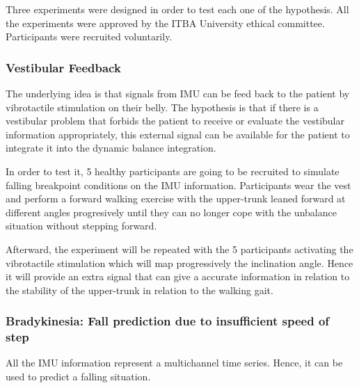 \documentclass[conference]{IEEEtran}
\begin{document}
Three experiments were designed in order to test each one of the hypothesis.  All the experiments were approved by the ITBA University ethical committee.  Participants were recruited voluntarily.


\subsubsection{Vestibular Feedback}

The underlying idea is that signals from IMU can be feed back to the patient by vibrotactile stimulation on their belly.  The hypothesis is that if there is a vestibular problem that forbids the patient to receive or evaluate the vestibular information appropriately, this external signal can be available for the patient to integrate it into the dynamic balance integration.

In order to test it, 5 healthy participants are going to be recruited to simulate falling breakpoint conditions on the IMU information.  Participants wear the vest and perform a forward walking exercise with the upper-trunk leaned forward at different angles progresively until they can no longer cope with the unbalance situation without stepping forward.

Afterward, the experiment will be repeated with the 5 participants activating the vibrotactile stimulation which will map progressively the inclination angle.  Hence it will provide an extra signal that can give a accurate information in relation to the stability of the upper-trunk in relation to the walking gait.

\subsubsection{Bradykinesia: Fall prediction due to insufficient speed of step}

All the IMU information represent a multichannel time series.  Hence, it can be used to predict a falling situation.   
\end{document}
